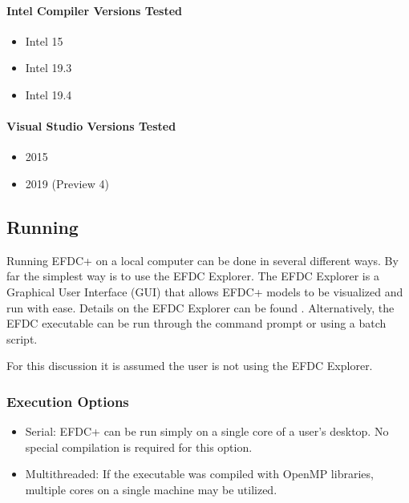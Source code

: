 \documentclass[letterpaper,10pt,english]{sphinxmanual}
\begin{document}
\paragraph{Intel Compiler Versions Tested}
\label{\detokenize{started/build:intel-compiler-versions-tested}}\begin{itemize}
\item {} 
Intel 15

\item {} 
Intel 19.3

\item {} 
Intel 19.4

\end{itemize}


\paragraph{Visual Studio Versions Tested}
\label{\detokenize{started/build:visual-studio-versions-tested}}\begin{itemize}
\item {} 
2015

\item {} 
2019 (Preview 4)

\end{itemize}


\subsection{Running}
\label{\detokenize{started/running:running}}\label{\detokenize{started/running:id1}}\label{\detokenize{started/running::doc}}
Running EFDC+ on a local computer can be done in several different ways.  By far the simplest way is to use the EFDC Explorer.  The EFDC Explorer is a Graphical User Interface (GUI) that allows EFDC+ models to be visualized and run with ease. Details on the EFDC Explorer can be found .   Alternatively, the EFDC executable can be run through the command prompt or using a batch script.

For this discussion it is assumed the user is not using the EFDC Explorer.


\subsubsection{Execution Options}
\label{\detokenize{started/running:execution-options}}\begin{itemize}
\item {} 
Serial: EFDC+ can be run simply on a single core of a user’s desktop.  No special compilation is required for this option.

\item {} 
Multithreaded: If the executable was compiled with OpenMP libraries, multiple cores on a single machine may be utilized.

\end{itemize}
\end{document}
